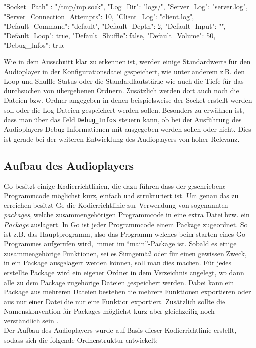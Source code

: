 \begin{jsonlisting}
{
"Socket_Path" : "/tmp/mp.sock",
"Log_Dir": "logs/",
"Server_Log": "server.log",
"Server_Connection_Attempts": 10,
"Client_Log": "client.log",
"Default_Command": "default",
"Default_Depth": 2,
"Default_Input": "",
"Default_Loop": true,
"Default_Shuffle": false,
"Default_Volume": 50,
"Debug_Infos": true
}
\end{jsonlisting}

Wie in dem Ausschnitt klar zu erkennen ist, werden einige Standardwerte für den
Audioplayer in der Konfigurationsdatei gespeichert, wie unter anderem z.B. den
Loop und Shuffle Status oder die Standardlautstärke wie auch die Tiefe für das
durchsuchen von übergebenen Ordnern. Zusätzlich werden dort auch noch die
Dateien bzw. Ordner angegeben in denen beispielsweise der Socket erstellt
werden soll oder die Log Dateien gespeichert werden sollen. Besonders zu
erwähnen ist, dass man über das Feld \verb|Debug_Infos| steuern kann, ob bei
der Ausführung des Audioplayers Debug-Informationen mit ausgegeben werden
sollen oder nicht. Dies ist gerade bei der weiteren Entwicklung des
Audioplayers von hoher Relevanz.

\subsection{Aufbau des Audioplayers}
Go besitzt einige Kodierrichtlinien, die dazu führen dass der geschriebene
Programmcode möglichst kurz, einfach und strukturiert ist. Um genau das zu
erreichen besitzt Go die Kodierrichtlinie zur Verwendung von sogenannten
\textit{packages}, welche zusammengehörigen Programmcode in eine extra Datei
bzw. ein \textit{Package} auslagert. In Go ist jeder Programmcode einem Package
zugeordnet. So ist z.B. das Hauptprogramm, also das Programm welches beim
starten eines Go-Programmes aufgerufen wird, immer im \enquote{main}-Package
ist. Sobald es einige zusammengehörige Funktionen, sei es Sinngemäß oder für
einen gewissen Zweck, in ein Package ausgelagert werden können, soll man dies
machen. Für jedes erstellte Package wird ein eigener Ordner in dem Verzeichnis
angelegt, wo dann alle zu dem Package zugehörige Dateien gespeichert werden.
Dabei kann ein Package aus mehreren Dateien bestehen die mehrere Funktionen
exportieren oder aus nur einer Datei die nur eine Funktion exportiert.
Zusätzlich sollte die Namenskonvention für Packages möglichst kurz aber
gleichzeitig noch verständlich sein \autocite{crawshaw_2019}. \\
Der Aufbau des Audioplayers wurde auf Basis dieser Kodierrichtlinie erstellt,
sodass sich die folgende Ordnerstruktur entwickelt:

